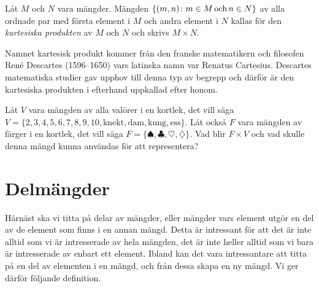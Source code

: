 \begin{definition}\label{def:KartesiskProdukt}
  Låt \(M\) och \(N\) vara mängder.
  Mängden \(\{(m,n)\colon m\in M\operatorname{och} n\in N\}\) av alla ordnade par med första
  element i \(M\) och andra element i \(N\) 
  kallas för den \emph{kartesiska produkten} av \(M\) och \(N\) och skrivs
  \(M\times N\).
\end{definition}
Namnet kartesisk produkt kommer från den franske matematikern och filosofen
René Descartes (1596--1650) vars latinska namn var Renatus Cartesius.
Descartes matematiska studier gav upphov till denna typ av begrepp och därför
är den kartesiska produkten i efterhand uppkallad efter honom.

\begin{exercise}\label{xrc:Kortlek}
  Låt \(V\) vara mängden av alla valörer i en kortlek, det vill säga
  \(V=\{2,3,4,5,6,7,8,9,10,\text{knekt},\text{dam},\text{kung},\text{ess}\}\).
  Låt också \(F\) vara mängden av färger i en kortlek, det vill säga
  \(F=\{\spadesuit,\clubsuit,\heartsuit,\diamondsuit\}\).
  Vad blir \(F\times V\) och vad skulle denna mängd kunna användas för att
  representera?
\end{exercise}


\section{Delmängder}
\label{sec:Delmangder}
Härnäst ska vi titta på delar av mängder, eller mängder vars
element utgör en del av de element som finns i en annan mängd.
Detta är intressant för att det är inte alltid som vi är intresserade av hela
mängden, det är inte heller alltid som vi bara är intresserade av enbart ett
element.
Ibland kan det vara intressantare att titta på en del av elementen i en mängd,
och från dessa skapa en ny mängd.
Vi ger därför följande definition.

